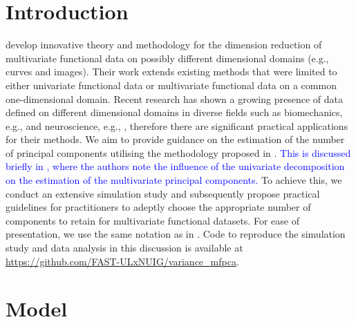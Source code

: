 
\section{Introduction} %
\label{sec:introduction}

\cite{happMultivariateFunctionalPrincipal2018} develop innovative theory and methodology for the dimension reduction of multivariate functional data on possibly different dimensional domains (e.g., curves and images). Their work extends existing methods that were limited to either univariate functional data or multivariate functional data on a common one-dimensional domain. Recent research has shown a growing presence of data defined on different dimensional domains in diverse fields such as biomechanics, e.g., \cite{warmenhovenBivariateFunctionalPrincipal2019} and neuroscience, e.g., \cite{songSparseMultivariateFunctional2022}, therefore there are significant practical applications for their methods. We aim to provide guidance on the estimation of the number of principal components utilising the methodology proposed in \cite{happMultivariateFunctionalPrincipal2018}. \textcolor{blue}{This is discussed briefly in \citet[Online Supplement, Section 2.3]{happMultivariateFunctionalPrincipal2018}, where the authors note the influence of the univariate decomposition on the estimation of the multivariate principal components.} To achieve this, we conduct an extensive simulation study and subsequently propose practical guidelines for practitioners to adeptly choose the appropriate number of components to retain for multivariate functional datasets. For ease of presentation, we use the same notation as in \cite{happMultivariateFunctionalPrincipal2018}. Code to reproduce the simulation study and data analysis in this discussion is available at \url{https://github.com/FAST-ULxNUIG/variance_mfpca}.


\section{Model} %
\label{sec:model}

